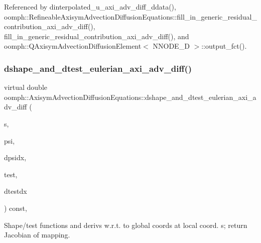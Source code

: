 Referenced by dinterpolated\+\_\+u\+\_\+axi\+\_\+adv\+\_\+diff\+\_\+ddata(), oomph\+::\+Refineable\+Axisym\+Advection\+Diffusion\+Equations\+::fill\+\_\+in\+\_\+generic\+\_\+residual\+\_\+contribution\+\_\+axi\+\_\+adv\+\_\+diff(), fill\+\_\+in\+\_\+generic\+\_\+residual\+\_\+contribution\+\_\+axi\+\_\+adv\+\_\+diff(), and oomph\+::\+Q\+Axisym\+Advection\+Diffusion\+Element$<$ N\+N\+O\+D\+E\+\_\+D $>$\+::output\+\_\+fct().

\mbox{\label{classoomph_1_1AxisymAdvectionDiffusionEquations_a92b918f392733e6128e192c2fbdb478c}} 
\subsubsection{\texorpdfstring{dshape\+\_\+and\+\_\+dtest\+\_\+eulerian\+\_\+axi\+\_\+adv\+\_\+diff()}{dshape\_and\_dtest\_eulerian\_axi\_adv\_diff()}}
{\footnotesize\ttfamily virtual double oomph\+::\+Axisym\+Advection\+Diffusion\+Equations\+::dshape\+\_\+and\+\_\+dtest\+\_\+eulerian\+\_\+axi\+\_\+adv\+\_\+diff (\begin{DoxyParamCaption}\item[{const \hyperlink{classoomph_1_1Vector}{Vector}$<$ double $>$ \&}]{s,  }\item[{\hyperlink{classoomph_1_1Shape}{Shape} \&}]{psi,  }\item[{\hyperlink{classoomph_1_1DShape}{D\+Shape} \&}]{dpsidx,  }\item[{\hyperlink{classoomph_1_1Shape}{Shape} \&}]{test,  }\item[{\hyperlink{classoomph_1_1DShape}{D\+Shape} \&}]{dtestdx }\end{DoxyParamCaption}) const\hspace{0.3cm}{\ttfamily [protected]}, {}}



Shape/test functions and derivs w.\+r.\+t. to global coords at local coord. s; return Jacobian of mapping. 



